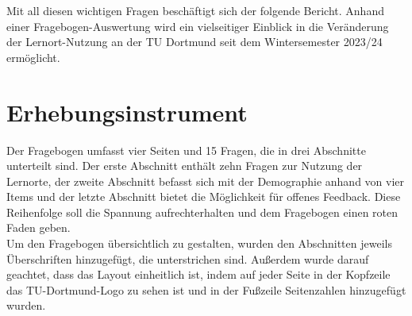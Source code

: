 \documentclass[11pt, a4paper]{article}
\begin{document}
Mit all diesen wichtigen Fragen beschäftigt sich der folgende Bericht.
Anhand einer Fragebogen-Auswertung wird ein vielseitiger Einblick in die Veränderung der Lernort-Nutzung an der TU Dortmund seit dem Wintersemester 2023/24 ermöglicht.


\newpage
\section{Erhebungsinstrument}
\label{Erhebungsinstrument}
Der Fragebogen umfasst vier Seiten und 15 Fragen, die in drei Abschnitte unterteilt sind. Der erste Abschnitt enthält zehn Fragen zur Nutzung der Lernorte, der zweite Abschnitt befasst sich mit der Demographie anhand von vier Items und der letzte Abschnitt bietet die Möglichkeit für offenes Feedback. Diese Reihenfolge soll die Spannung aufrechterhalten und dem Fragebogen einen roten Faden geben. \\
Um den Fragebogen übersichtlich zu gestalten, wurden den Abschnitten jeweils Überschriften hinzugefügt, die unterstrichen sind. Außerdem wurde darauf geachtet, dass das Layout einheitlich ist, indem auf jeder Seite in der Kopfzeile das TU-Dortmund-Logo zu sehen ist und in der Fußzeile Seitenzahlen hinzugefügt wurden. \\
\end{document}
